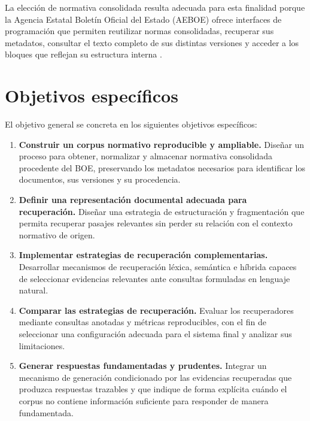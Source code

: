 La elección de normativa consolidada resulta adecuada para esta finalidad porque la Agencia Estatal Boletín Oficial del Estado (AEBOE) ofrece interfaces de programación que permiten reutilizar normas consolidadas, recuperar sus metadatos, consultar el texto completo de sus distintas versiones y acceder a los bloques que reflejan su estructura interna \cite{boeApiConsolidada}.

\section{Objetivos específicos}
\label{sec:objetivos-especificos}

El objetivo general se concreta en los siguientes objetivos específicos:

\begin{enumerate}
    \item[\textbf{OE-01}] \textbf{Construir un corpus normativo reproducible y ampliable.} Diseñar un proceso para obtener, normalizar y almacenar normativa consolidada procedente del BOE, preservando los metadatos necesarios para identificar los documentos, sus versiones y su procedencia.

    \item[\textbf{OE-02}] \textbf{Definir una representación documental adecuada para recuperación.} Diseñar una estrategia de estructuración y fragmentación que permita recuperar pasajes relevantes sin perder su relación con el contexto normativo de origen.

    \item[\textbf{OE-03}] \textbf{Implementar estrategias de recuperación complementarias.} Desarrollar mecanismos de recuperación léxica, semántica e híbrida capaces de seleccionar evidencias relevantes ante consultas formuladas en lenguaje natural.

    \item[\textbf{OE-04}] \textbf{Comparar las estrategias de recuperación.} Evaluar los recuperadores mediante consultas anotadas y métricas reproducibles, con el fin de seleccionar una configuración adecuada para el sistema final y analizar sus limitaciones.

    \item[\textbf{OE-05}] \textbf{Generar respuestas fundamentadas y prudentes.} Integrar un mecanismo de generación condicionado por las evidencias recuperadas que produzca respuestas trazables y que indique de forma explícita cuándo el corpus no contiene información suficiente para responder de manera fundamentada.


\end{enumerate}

